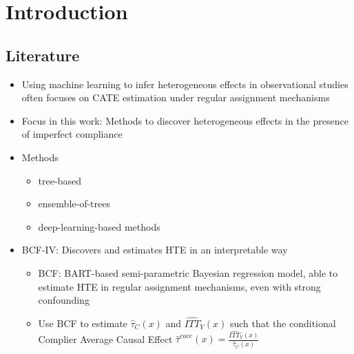 \chapter{Introduction}

\cite{hahn_bayesian_2020} 

\section{Literature}


\begin{itemize}
    \item Using machine learning to infer heterogeneous effects in observational studies often focuses on CATE estimation under regular assignment mechanisms 
    \item Focus in this work: Methods to discover heterogeneous effects in the presence of imperfect compliance
    \item Methods
    \begin{itemize}
        \item tree-based 
        \item ensemble-of-trees 
        \item deep-learning-based methods 
    \end{itemize}
    \item BCF-IV: Discovers and estimates HTE in an interpretable way %
    \begin{itemize}
        \item BCF: BART-based semi-parametric Bayesian regression model, able to estimate HTE in regular assignment mechanisms, even with strong confounding %
        \item Use BCF to estimate $\hat\tau_C(x)$ and  $\widehat{ITT}_{Y}(x)$ such that the conditional Complier Average Causal Effect $\hat\tau^{cace}(x) = \frac{\widehat{ITT}_{Y}(x)}{\hat\tau_C(x)}$
    \end{itemize}
\end{itemize}


